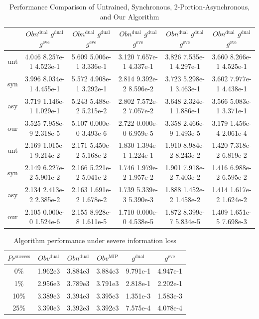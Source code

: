 \documentclass[journal]{IEEEtran}
\begin{document}
\begin{table}[!t]
\caption{Performance Comparison of Untrained, Synchronous, 2-Portion-Asynchronous, and Our Algorithm}
\label{tab:comparison}
\centering
\begin{tabular}{c|c|c|c|c|c}
\hline
& $Obn^\textrm{dual}$ \; $g^\textrm{dual}$ \; $g^\textrm{eve}$ & $Obn^\textrm{dual}$ \; $g^\textrm{dual}$ \; $g^\textrm{eve}$ & $Obn^\textrm{dual}$ \; $g^\textrm{dual}$ \; $g^\textrm{eve}$ & $Obn^\textrm{dual}$ \; $g^\textrm{dual}$ \; $g^\textrm{eve}$ & $Obn^\textrm{dual}$ \; $g^\textrm{dual}$ \; $g^\textrm{eve}$\\
\hline
unt & 4.046  8.257e-1  4.523e-1 &  5.609  5.006e-1  3.336e-1  & 3.120  7.657e-1  4.337e-1  & 3.826  7.535e-1  4.297e-1 & 3.660  8.266e-1  4.525e-1 \\
syn & 3.996  8.034e-1  4.455e-1 &  5.572  4.908e-1  3.292e-1  & 2.814  9.392e-2  8.596e-2  & 3.723  5.298e-1  3.463e-1 & 3.602  7.977e-1  4.438e-1 \\
asy & 3.719  1.146e-1  1.029e-1 &  5.243  5.488e-2  5.215e-2  & 2.802  7.572e-2  7.057e-2  & 3.648  2.324e-1  1.886e-1 & 3.566  5.083e-1  3.371e-1 \\
our & 3.525  7.958e-9  2.318e-5 &  5.107  0.000e-0  3.493e-6  & 2.722  0.000e-0  6.959e-5  & 3.358  2.466e-9  1.493e-5 & 3.179  1.456e-4  2.061e-4 \\
\hline
unt & 2.169  1.015e-1  9.214e-2 & 2.171  5.450e-2  5.168e-2 & 1.830  1.394e-1  1.224e-1 & 1.910  8.984e-2  8.243e-2 & 1.420  7.318e-2  6.819e-2 \\
syn & 2.149  6.227e-2  5.901e-2 & 2.166  5.221e-2  5.041e-2 & 1.746  1.979e-2  1.957e-2 & 1.901  7.918e-2  7.403e-2 & 1.416  6.988e-2  6.595e-2 \\
asy & 2.134  2.413e-2  2.385e-2 & 2.163  1.691e-2  1.678e-2 & 1.739  5.339e-3  5.390e-3 & 1.888  1.452e-2  1.458e-2 & 1.414  1.617e-2  1.624e-2 \\
our & 2.105  0.000e-0  1.524e-6 & 2.155  8.928e-8  1.611e-5 & 1.710  0.000e-0  4.538e-5 & 1.872  8.399e-7  5.834e-5 & 1.409  1.651e-5  7.698e-3 \\ \hline
\end{tabular}
\end{table}
\begin{table}[!t]
\caption{Algorithm performance under severe information loss}
\label{tab:infoloss}
\centering
\begin{tabular}{c|c|c|c|c|c}
\hline
$Pr^\textrm{success}$ & $Obv^\textrm{dual}$ & $Obn^\textrm{dual}$ & $Obv^\textrm{MIP}$ & $g^\textrm{dual}$ & $g^\textrm{eve}$ \\ \hline
0\%  & 1.962e3 & 3.884e3 & 3.884e3 & 9.791e-1 & 4.947e-1\\
1\%  & 2.956e3 & 3.789e3 & 3.791e3 & 2.818e-1 & 2.202e-1\\
10\% & 3.389e3 & 3.394e3 & 3.395e3 & 1.351e-3 & 1.583e-3\\
25\% & 3.390e3 & 3.392e3 & 3.392e3 & 7.575e-4 & 4.078e-4 \\
\hline
\end{tabular}
\end{table}
\end{document}
